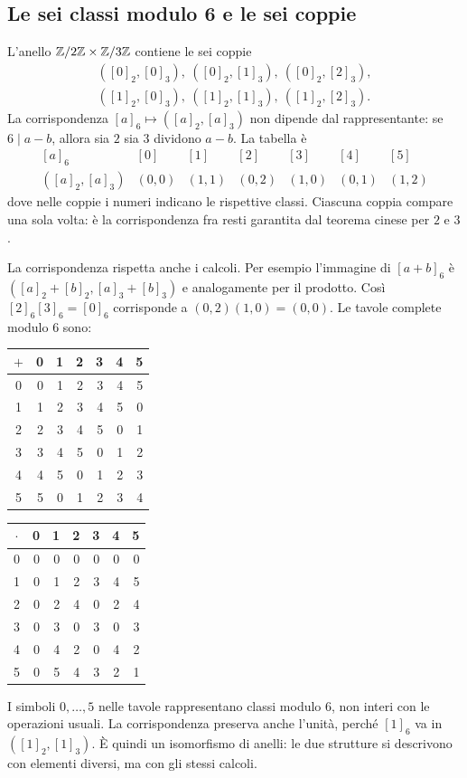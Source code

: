 \subsection{Le sei classi modulo 6 e le sei coppie}
L'anello $\mathbb{Z}/2\mathbb{Z}\times\mathbb{Z}/3\mathbb{Z}$ contiene le sei coppie
\[
\begin{gathered}
([0]_2,[0]_3),\ ([0]_2,[1]_3),\ ([0]_2,[2]_3),\\
([1]_2,[0]_3),\ ([1]_2,[1]_3),\ ([1]_2,[2]_3).
\end{gathered}
\]
La corrispondenza $[a]_6\mapsto([a]_2,[a]_3)$ non dipende dal rappresentante: se $6\mid a-b$, allora sia $2$ sia $3$ dividono $a-b$. La tabella è
\[
\begin{array}{c|cccccc}
[a]_6&[0]&[1]&[2]&[3]&[4]&[5]\\\hline
([a]_2,[a]_3)&(0,0)&(1,1)&(0,2)&(1,0)&(0,1)&(1,2)
\end{array}
\]
dove nelle coppie i numeri indicano le rispettive classi. Ciascuna coppia compare una sola volta: è la corrispondenza fra resti garantita dal teorema cinese per $2$ e $3$.

La corrispondenza rispetta anche i calcoli. Per esempio l'immagine di $[a+b]_6$ è $([a]_2+[b]_2,[a]_3+[b]_3)$ e analogamente per il prodotto. Così $[2]_6[3]_6=[0]_6$ corrisponde a $(0,2)(1,0)=(0,0)$. Le tavole complete modulo $6$ sono:
\begin{schema}
\renewcommand{\arraystretch}{1.18}
\begin{tabular}{c|rrrrrr}
$+$&0&1&2&3&4&5\\\hline
0&0&1&2&3&4&5\\
1&1&2&3&4&5&0\\
2&2&3&4&5&0&1\\
3&3&4&5&0&1&2\\
4&4&5&0&1&2&3\\
5&5&0&1&2&3&4
\end{tabular}
\qquad
\begin{tabular}{c|rrrrrr}
$\cdot$&0&1&2&3&4&5\\\hline
0&0&0&0&0&0&0\\
1&0&1&2&3&4&5\\
2&0&2&4&0&2&4\\
3&0&3&0&3&0&3\\
4&0&4&2&0&4&2\\
5&0&5&4&3&2&1
\end{tabular}
\end{schema}
I simboli $0,\ldots,5$ nelle tavole rappresentano classi modulo $6$, non interi con le operazioni usuali.
La corrispondenza preserva anche l'unità, perché $[1]_6$ va in $([1]_2,[1]_3)$. È quindi un isomorfismo di anelli: le due strutture si descrivono con elementi diversi, ma con gli stessi calcoli.


